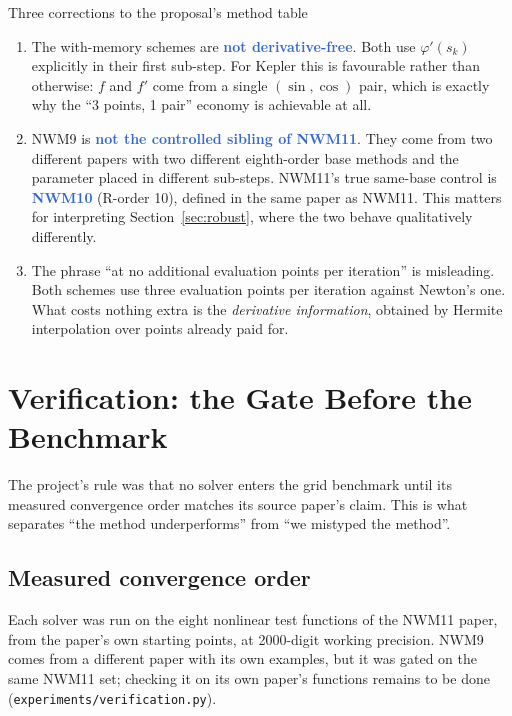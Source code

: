 \documentclass[11pt,a4paper]{article}
\newcommand{\key}[1]{\textcolor{Highlight}{\bfseries #1}}
\begin{document}
\vspace{0.5em}
\begin{notetitled}{Three corrections to the proposal's method table}
\begin{enumerate}[leftmargin=1.4em, itemsep=0.35em]
  \item The with-memory schemes are \key{not derivative-free}. Both use
        $\varphi'(s_k)$ explicitly in their first sub-step. For Kepler this
        is favourable rather than otherwise: $f$ and $f'$ come from a
        single $(\sin,\cos)$ pair, which is exactly why the ``3 points,
        1 pair'' economy is achievable at all.
  \item NWM9 is \key{not the controlled sibling of NWM11}. They come from
        two different papers with two different eighth-order base methods
        and the parameter placed in different sub-steps. NWM11's true
        same-base control is \key{NWM10} (R-order 10), defined in the same
        paper as NWM11. This matters for interpreting
        Section~\ref{sec:robust}, where the two behave qualitatively
        differently.
  \item The phrase ``at no additional evaluation points per iteration''
        is misleading. Both schemes use three evaluation points per
        iteration against Newton's one. What costs nothing extra is the
        \emph{derivative information}, obtained by Hermite interpolation
        over points already paid for.
\end{enumerate}
\end{notetitled}

\section{Verification: the Gate Before the Benchmark}
\label{sec:verify}

The project's rule was that no solver enters the grid benchmark until its
measured convergence order matches its source paper's claim. This is what separates ``the method
underperforms'' from ``we mistyped the method''.

\subsection{Measured convergence order}

Each solver was run on the eight nonlinear test functions of the NWM11
paper, from the paper's own starting points, at 2000-digit working
precision. NWM9 comes from a different paper with its own examples, but
it was gated on the same NWM11 set; checking it on its own paper's
functions remains to be done (\texttt{experiments/verification.py}).
\end{document}
